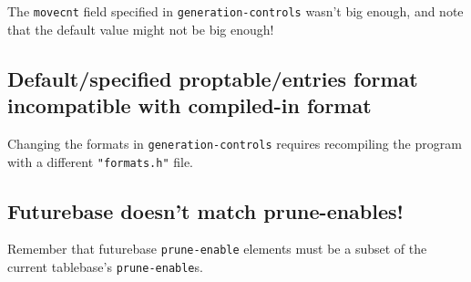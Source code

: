 \documentclass[11pt]{article}
\begin{document}
The {\tt movecnt} field specified in {\tt generation-controls} wasn't big enough,
and note that the default value might not be big enough!

\subsection{Default/specified proptable/entries format incompatible with compiled-in format}

Changing the formats in {\tt generation-controls} requires recompiling
the program with a different {\tt "formats.h"} file.

\subsection{Futurebase doesn't match prune-enables!}

Remember that futurebase {\tt prune-enable} elements must be a
subset of the current tablebase's {\tt prune-enable}s.
\end{document}
